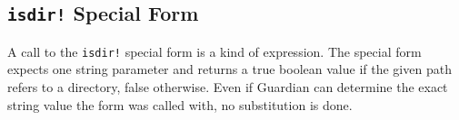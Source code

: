 
\subsection{\texttt{isdir!} Special Form}
{
	A call to the \texttt{isdir!} special form is a kind of expression.
	The special form expects one string parameter and returns a true boolean
	value if the given path refers to a directory, false
	otherwise.
	Even if Guardian can determine the exact string value the form was
	called with, no substitution is done.
}
